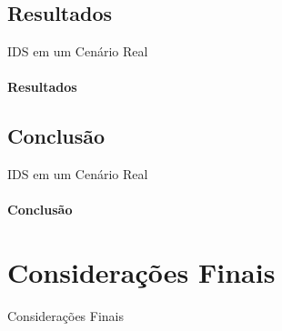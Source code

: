 \documentclass[aspectratio=169]{beamer}
\begin{document}
\subsection{Resultados}
\begin{frame}{IDS em um Cenário Real}
    \framesubtitle{Resultados}
\end{frame}
\subsection{Conclusão}
\begin{frame}{IDS em um Cenário Real}
    \framesubtitle{Conclusão}
\end{frame}
\section{Considerações Finais}
\begin{frame}{Considerações Finais}
\end{frame}
\end{document}
